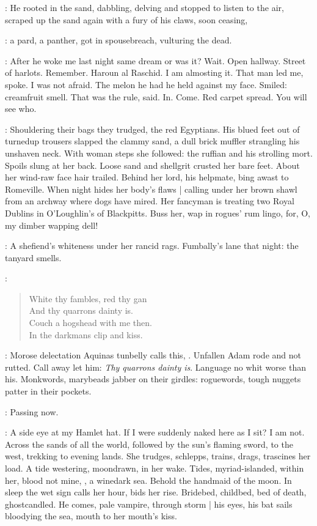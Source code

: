 :
He rooted in the sand,
dabbling, delving
and stopped to listen to the air,
scraped up the sand
again with a fury of his claws,
soon ceasing,

\StephenInt:
a pard, a panther,
got in spousebreach,
vulturing the dead.

\StephenInt:
After he woke me last night same dream or was it?
Wait.
Open hallway.
Street of harlots.
Remember.
Haroun al Raschid.
I am almosting it.
That man led me, spoke.
I was not afraid.
The melon he had he held against my face.
Smiled:
creamfruit smell.
That was the rule, said.
In.
Come.
Red carpet spread.
You will see who.

:
Shouldering their bags they trudged, the red Egyptians.
His blued feet out of turnedup trousers
slapped the clammy sand,
a dull brick muffler strangling his unshaven neck.
With woman steps she followed:
the ruffian and his strolling mort.
Spoils slung at her back.
Loose sand and shellgrit crusted her bare feet.
About her wind-raw face hair trailed.
Behind her lord, his helpmate,
bing awast to Romeville.
When night hides her body's flaws |
calling under her brown shawl from an archway where dogs have mired.
Her fancyman is treating two Royal Dublins in O'Loughlin's of Blackpitts.
Buss her, wap in rogues' rum lingo,
for, O, my dimber wapping dell!

\StephenInt:
A shefiend's whiteness under her rancid rags.
Fumbally's lane that night:
the tanyard smells.

\StephenInt:
\begin{verse}
    White thy fambles, red thy gan \\
    And thy quarrons dainty is. \\
    Couch a hogshead with me then. \\
    In the darkmans clip and kiss.
\end{verse}

\StephenInt:
Morose delectation Aquinas tunbelly calls this, .
Unfallen Adam rode and not rutted.
Call away let him:
\emph{Thy quarrons dainty is}.
Language no whit worse than his.
Monkwords, marybeads jabber on their girdles:
roguewords, tough nuggets patter in their pockets.

\StephenInt:
Passing now.

\StephenInt:
A side eye at my Hamlet hat.
If I were suddenly naked here as I sit?
I am not.
Across the sands of all the world,
followed by the sun's flaming sword,
to the west, trekking to evening lands.
She trudges, schlepps,
trains, drags, trascines her load.
A tide westering, moondrawn, in her wake.
Tides, myriad-islanded, within her,
blood not mine,
,
a winedark sea.
Behold the handmaid of the moon.
In sleep the wet sign calls her hour, bids her rise.
Bridebed, childbed,
bed of death,
ghostcandled.
He comes, pale vampire, through storm |
his eyes, his bat sails bloodying the sea,
mouth to her mouth's kiss.

